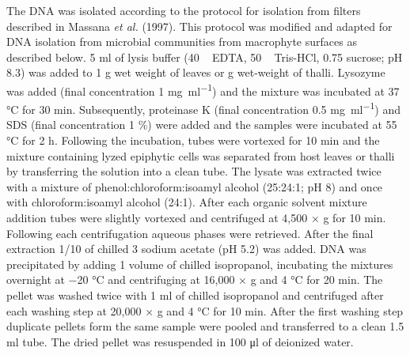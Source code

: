 \documentclass[12pt,]{article}
\begin{document}
The DNA was isolated according to the protocol for isolation from
filters described in Massana \emph{et al.} (1997). This protocol was
modified and adapted for DNA isolation from microbial communities from
macrophyte surfaces as described below. 5 \si{\ml} of lysis buffer (40
\si{\milli\Molar} EDTA, 50 \si{\milli\Molar} Tris-HCl, 0.75 \si{\Molar}
sucrose; pH 8.3) was added to 1 \si{\g} wet weight of leaves or \si{\g}
wet-weight of thalli. Lysozyme was added (final concentration 1
\si{\mg\per\ml}) and the mixture was incubated at 37 \si{\degreeCelsius}
for 30 \si{\minute}. Subsequently, proteinase K (final concentration 0.5
\si{\mg\per\ml}) and SDS (final concentration 1 \si{\percent}) were
added and the samples were incubated at 55 \si{\degreeCelsius} for 2
\si{\hour}. Following the incubation, tubes were vortexed for 10
\si{\minute} and the mixture containing lyzed epiphytic cells was
separated from host leaves or thalli by transferring the solution into a
clean tube. The lysate was extracted twice with a mixture of
phenol:chloroform:isoamyl alcohol (25:24:1; pH 8) and once with
chloroform:isoamyl alcohol (24:1). After each organic solvent mixture
addition tubes were slightly vortexed and centrifuged at 4,500 × g for
10 \si{\minute}. Following each centrifugation aqueous phases were
retrieved. After the final extraction 1/10 of chilled 3 \si{\Molar}
sodium acetate (pH 5.2) was added. DNA was precipitated by adding 1
volume of chilled isopropanol, incubating the mixtures overnight at
\num{-20} °C and centrifuging at 16,000 × g and 4 \si{\degreeCelsius}
for 20 \si{\minute}. The pellet was washed twice with 1 \si{\ml} of
chilled isopropanol and centrifuged after each washing step at 20,000 ×
g and 4 \si{\degreeCelsius} for 10 \si{\minute}. After the first washing
step duplicate pellets form the same sample were pooled and transferred
to a clean 1.5 \si{\ml} tube. The dried pellet was resuspended in 100
\si{\ul} of deionized water.
\end{document}
